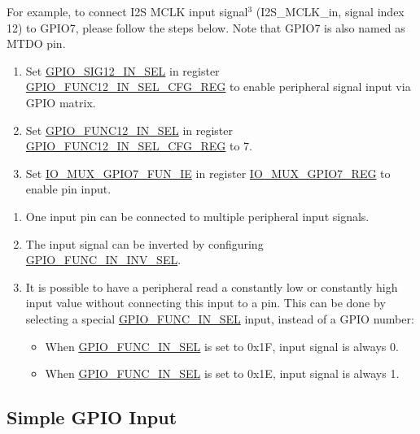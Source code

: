 \documentclass[main\_\_EN.tex]{subfiles}
\begin{document}
For example, to connect I2S MCLK input signal\hyperref[input-note-3]{$^3$} (I2S\_MCLK\_in, signal index 12) to GPIO7, please follow the steps below. Note that GPIO7 is also named as MTDO pin.

\begin{enumerate}
\item Set \hyperref[fielddesc:GPIOSIGNINSEL]{GPIO\_SIG12\_IN\_SEL} in register \hyperref[regdesc:GPIOFUNCNINSELCFGREG]{GPIO\_FUNC12\_IN\_SEL\_CFG\_REG} to enable peripheral signal input via GPIO matrix.
\item Set \hyperref[fielddesc:GPIOFUNCNINSEL]{GPIO\_FUNC12\_IN\_SEL} in register \hyperref[regdesc:GPIOFUNCNINSELCFGREG]{GPIO\_FUNC12\_IN\_SEL\_CFG\_REG} to 7.
\item Set \hyperref[fielddesc:IOMUXGPIONFUNIE]{IO\_MUX\_GPIO7\_FUN\_IE} in register \hyperref[regdesc:IOMUXGPIONREG]{IO\_MUX\_GPIO7\_REG} to enable pin input.
\end{enumerate}

\begin{tiplisting}
\vspace{-2em}
\begin{enumerate}
\item \label{input-note-1}  One input pin can be connected to multiple peripheral input signals.
\item \label{input-note-2} The input signal can be inverted by configuring \hyperref[fielddesc:GPIOFUNCNININVSEL]{GPIO\_FUNC\_IN\_INV\_SEL}.
\item \label{input-note-3} It is possible to have a peripheral read a constantly low or constantly high input value without connecting this input to a pin. This can be done by selecting a special \hyperref[fielddesc:GPIOFUNCNINSEL]{GPIO\_FUNC\_IN\_SEL} input, instead of a GPIO number:
\begin {itemize}
\item When \hyperref[fielddesc:GPIOFUNCNINSEL]{GPIO\_FUNC\_IN\_SEL} is set to 0x1F, input signal is always 0.
\item When \hyperref[fielddesc:GPIOFUNCNINSEL]{GPIO\_FUNC\_IN\_SEL} is set to 0x1E, input signal is always 1.
\end{itemize}
\end{enumerate}
\end{tiplisting}

\subsection{Simple GPIO Input}\label{IOMUXSimpleGPIOInput}
\end{document}
